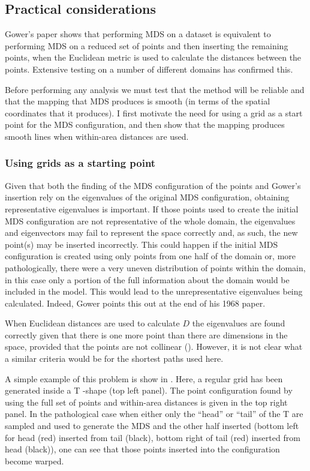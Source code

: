 \subsection{Practical considerations}

Gower's paper shows that performing MDS on a dataset is equivalent to performing MDS on a reduced set of points and then inserting the remaining points, when the Euclidean metric is used to calculate the distances between the points. Extensive testing on a number of different domains has confirmed this.

Before performing any analysis we must test that the method will be reliable and that the mapping that MDS produces is smooth (in terms of the spatial coordinates that it produces). I first motivate the need for using a grid as a start point for the MDS configuration, and then show that the mapping produces smooth lines when within-area distances are used.

\subsubsection{Using grids as a starting point}
\label{grids}
Given that both the finding of the MDS configuration of the points and Gower's insertion rely on the eigenvalues of the original MDS configuration, obtaining representative eigenvalues is important. If those points used to create the initial MDS configuration are not representative of the whole domain, the eigenvalues and eigenvectors may fail to represent the space correctly and, as such, the new point(s) may be inserted incorrectly. This could happen if the initial MDS configuration is created using only points from one half of the domain or, more pathologically, there were a very uneven distribution of points within the domain, in this case only a portion of the full information about the domain would be included in the model. This would lead to the unrepresentative eigenvalues being calculated. Indeed, Gower points this out at the end of his 1968 paper.

When Euclidean distances are used to calculate $D$ the eigenvalues are found correctly given that there is one more point than there are dimensions in the space, provided that the points are not collinear (\cite{landmark}). However, it is not clear what a similar criteria would be for the shortest paths used here. 

A simple example of this problem is show in . Here, a regular grid has been generated inside a T -shape (top left panel). The point configuration found by using the full set of points and within-area distances is given in the top right panel. In the pathological case when either only the ``head'' or ``tail'' of the T are sampled and used to generate the MDS and the other half inserted (bottom left for head (red) inserted from tail (black), bottom right of tail (red) inserted from head (black)), one can see that those points inserted into the configuration become warped. 

